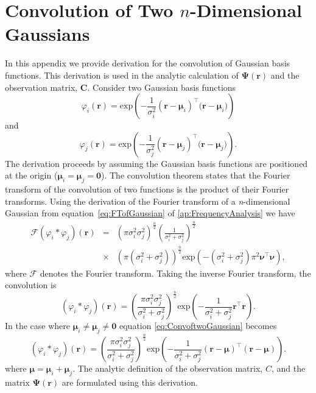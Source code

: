 \documentclass[]{article}
\begin{document}
\section*{Convolution of Two $n$-Dimensional Gaussians}\label{ap:ConvOfGaussians}
In this appendix we provide derivation for the convolution of Gaussian basis functions. This derivation is used in the analytic calculation of $\boldsymbol\Psi(\mathbf{r})$ and the observation matrix, $\mathbf C$. Consider two Gaussian basis functions
\begin{equation}\label{eq:n_dimensional_Gaussian1}
 \varphi_i(\mathbf r)=\mathrm{exp}\left({-\frac{1}{\sigma_i^2} (\mathbf r-\boldsymbol \mu_i)^\top(\mathbf r-\boldsymbol \mu_i})\right)
\end{equation}
and 
\begin{equation}\label{eq:n_dimensional_Gaussian2}
\varphi_j(\mathbf r)=\mathrm{exp}\left({-\frac{1}{\sigma_j^2} (\mathbf r-\boldsymbol \mu_j)^\top(\mathbf r-\boldsymbol \mu_j})\right).
\end{equation}
The derivation proceeds by assuming the Gaussian basis functions are positioned at the origin ($\boldsymbol\mu_i=\boldsymbol\mu_j=\mathbf 0$). The convolution theorem states that the Fourier transform of the convolution of two functions is the product of their Fourier transforms. Using the derivation of the Fourier transform of a \emph{n}-dimensional Gaussian from equation~\ref{eq:FTofGaussian} of \ref{ap:FrequencyAnalysis} we have
\begin{eqnarray}
\mathcal{F}\left(\varphi_i*\varphi_j\right)(\mathbf{r}) &=& \left(\pi\sigma_i^2\sigma_j^2\right)^{\frac{n}{2}}\left(\frac{1}{\sigma_i^2+\sigma_j^2}\right)^{\frac{n}{2}} \nonumber \\
&\times& (\pi(\sigma_i^2+\sigma_j^2))^{\frac{n}{2}}\mathrm{exp}\left(-(\sigma_i^2+\sigma_j^2)\pi^2\boldsymbol\nu^\top\boldsymbol\nu\right),
\end{eqnarray}
where $\mathcal{F}$ denotes the Fourier transform. Taking the inverse Fourier transform, the convolution is
\begin{equation}\label{eq:ConvoftwoGaussian}
 \left(\varphi_i*\varphi_j\right)(\mathbf{r}) = \left(\frac{\pi\sigma_i^2\sigma_j^2}{\sigma_i^2+\sigma_j^2}\right)^{\frac{n}{2}}\mathrm{exp}\left({-\frac{1}{\sigma_i^2+\sigma_j^2} \mathbf r^\top\mathbf r}\right).
\end{equation}
In the case where $\boldsymbol\mu_i\neq\boldsymbol\mu_j\neq\mathbf 0$ equation \ref{eq:ConvoftwoGaussian} becomes
\begin{equation}\label{eq:ConvoftwoGaussianNonzeroMean}
 \left(\varphi_i*\varphi_j\right)(\mathbf{r}) = \left( \frac{\pi\sigma_i^2\sigma_j^2} {\sigma_i^2+\sigma_j^2}\right)^{\frac{n}{2}} \mathrm{exp}\left({-\frac{1}{\sigma_i^2+\sigma_j^2} (\mathbf r-\boldsymbol\mu)^\top(\mathbf r-\boldsymbol\mu)}\right).
\end{equation}
where $\boldsymbol\mu=\boldsymbol\mu_i+\boldsymbol\mu_j$. 
The analytic definition of the observation matrix, $C$, and the matrix $\boldsymbol\Psi(\mathbf{r})$ are formulated using this derivation.  
\end{document}
